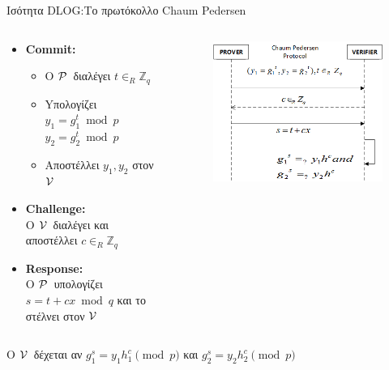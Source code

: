 \documentclass[10pt,handout]{beamer}
\begin{document}
\begin{frame}[allowframebreaks]{Ισότητα DLOG:Το πρωτόκολλο Chaum Pedersen}
\begin{columns}
\begin{small}
\begin{itemize}
\item  \textbf{Commit:}
\begin{itemize}
\item Ο $\mathcal{P}\,$  διαλέγει $t \in_R \mathbb{Z}_q$
\item Yπολογίζει $y_1 = g_{1}^{t} \bmod{p}$\\ $y_2 = g_{2}^{t} \bmod{p}$
\item Αποστέλλει $y_1, y_2$  στον $\mathcal{V}\,$ 
\end{itemize}
\item  \textbf{Challenge:}\\  
Ο $\mathcal{V}\,$ διαλέγει και αποστέλλει $c \in_R \mathbb{Z}_q$ 
\item  \textbf{Response:}\\   
Ο $\mathcal{P}\,$ υπολογίζει $s = t+cx \bmod{q}$ και το στέλνει στον $\mathcal{V}\,$
\end{itemize} 
\end{small}
\begin{figure}
\includegraphics[width=1\textwidth]{chaumpedersen.png} 
\end{figure}
\end{columns}

\begin{center}
Ο $\mathcal{V}\,$ δέχεται αν  $g^s_1 = y_1h_{1}^c \pmod{p}$ και  $g^s_2 = y_2h_{2}^c \pmod{p}$ 
\end{center}


\end{frame}
\end{document}

